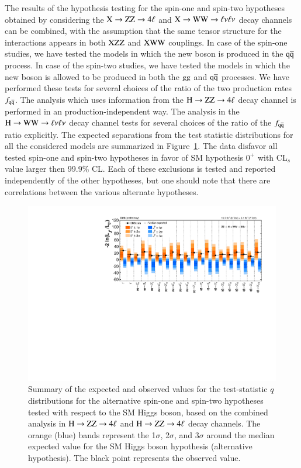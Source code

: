 The results of the hypothesis testing for the spin-one and spin-two
hypotheses obtained by considering the $\mathrm{X}\to\mathrm{Z}\mathrm{Z}\to4\ell$ and
$\mathrm{X}\to\mathrm{W}\mathrm{W}\to\ell\nu\ell\nu$ decay channels can be combined, with
the assumption that the same tensor structure for the interactions
appears in both $\mathrm{X}\mathrm{Z}\mathrm{Z}$ and $\mathrm{X}\mathrm{W}\mathrm{W}$ couplings.  In case of the
spin-one studies, we have tested the models in which the new boson is
produced in the $\mathrm{\mathrm{q}\mathrm{\overline{q}}}$ process. In case of the spin-two studies, we
have tested the models in which the new boson is allowed to be
produced in both the $\mathrm{g}\mathrm{g}$ and $\mathrm{\mathrm{q}\mathrm{\overline{q}}}$ processes.  We have
performed these tests for several choices of the ratio of the two
production rates $f_{\mathrm{\mathrm{q}\mathrm{\overline{q}}}}$.  The analysis which uses information
from the $\mathrm{H}\to\mathrm{Z}\mathrm{Z}\to4\ell$ decay channel is performed in an
production-independent way.  The analysis in the $\mathrm{H}\to\mathrm{W}\mathrm{W}\to\ell\nu\ell\nu$ decay
channel tests for several choices of the ratio of the $f_{\mathrm{\mathrm{q}\mathrm{\overline{q}}}}$
ratio explicitly.  The expected separations from the test statistic
distributions for all the considered models are summarized in
Figure~\ref{fig:jp_summary_comb}. The data disfavor all tested
spin-one and spin-two hypotheses in favor of SM hypothesis $0^+$ with
CL$_s$ value larger then 99.9\% CL. Each of these exclusions is tested
and reported independently of the other hypotheses, but one should
note that there are correlations between the various alternate
hypotheses.

\begin{figure}[!htbp]
  \begin{center}
    \includegraphics[width=0.95\linewidth]{figures/JP_SummaryPlot.pdf}
    \caption{
     Summary of the expected and observed values for the
      test-statistic $q$ distributions for the alternative spin-one and spin-two
      hypotheses tested with respect to the SM Higgs boson, based on the 
     combined analysis in $\mathrm{H}\to\mathrm{Z}\mathrm{Z}\to4\ell$ and 
     $\mathrm{H}\to\mathrm{Z}\mathrm{Z}\to4\ell$ decay channels.  The
      orange (blue) bands represent the 1$\sigma$, 2$\sigma$, and
      3$\sigma$ around the median expected value for the SM Higgs
      boson hypothesis (alternative hypothesis). The black point
      represents the observed value.
      \label{fig:jp_summary_comb}} 
  \end{center}
\end{figure}


